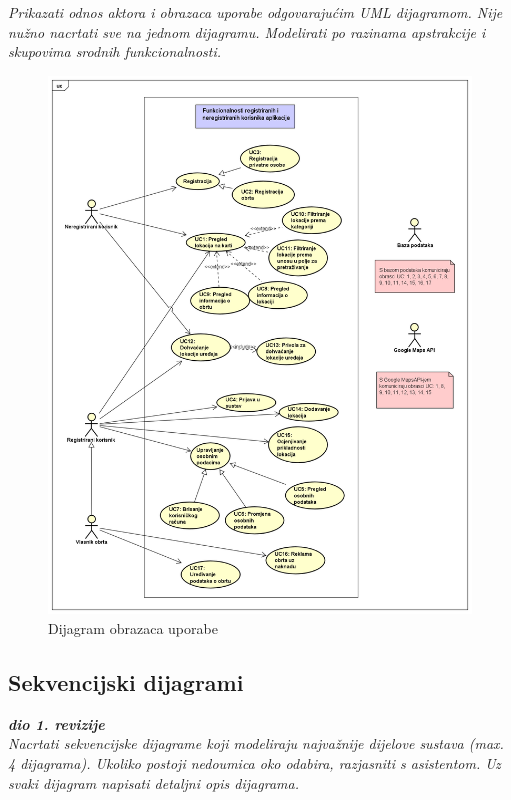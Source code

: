 					\textit{Prikazati odnos aktora i obrazaca uporabe odgovarajućim UML dijagramom. Nije nužno nacrtati sve na jednom dijagramu. Modelirati po razinama apstrakcije i skupovima srodnih funkcionalnosti.}
					\begin{figure}[H]
						\includegraphics[scale=1.2]{slike/UseCaseDiagram2.png}
						\centering
						\caption{Dijagram obrazaca uporabe}
						\label{fig:promjene}
					\end{figure}
				\eject		
				
			\subsection{Sekvencijski dijagrami}
				
				\textbf{\textit{dio 1. revizije}}\\
				
				\textit{Nacrtati sekvencijske dijagrame koji modeliraju najvažnije dijelove sustava (max. 4 dijagrama). Ukoliko postoji nedoumica oko odabira, razjasniti s asistentom. Uz svaki dijagram napisati detaljni opis dijagrama.}
				\eject
	
